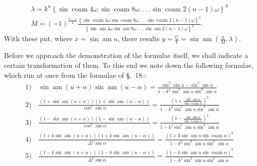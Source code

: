 \documentclass{article}
\begin{document}
\[
\begin{gathered}
\lambda=k^{n}\left\{\sin\operatorname{coam}4\omega.\sin\operatorname{coam}8\omega.\,.\,.\,.\sin\operatorname{coam}2(n-1)\omega\right\}^{4}\\[1.5ex]
M=(-1)^{\frac{n-1}{2}}\frac{\left\{\sin\operatorname{coam}4\omega\sin\operatorname{coam}8\omega.\,.\,.\,.\sin\operatorname{coam}2(n-1)\omega\right\}^{2}}{\left\{\sin\operatorname{am}4\omega\sin\operatorname{am}8\omega.\,.\,.\,.\sin\operatorname{am}2(n-1)\omega\right\}^{2}}.
\end{gathered}
\]
With these put, where $x=\sin\operatorname{am}u$, there results $y=\frac{U}{V}=\sin\operatorname{am}\left(\frac{u}{M},\lambda\right)$.

Before we approach the demonstration of the formulae itself, we shall indicate a certain transformation of them. To this end we note down the following formulae, which run at once from the formulae of §.\ 18.:
\[
\begin{gathered}
\text{1)}\quad\sin\operatorname{am}(u+\alpha)\sin\operatorname{am}(u-\alpha)=\frac{\sin^{2}\operatorname{am}u-\sin^{2}\operatorname{am}\alpha}{1-k^{2}\sin^{2}\operatorname{am}u\sin^{2}\operatorname{am}\alpha}\\[1.5ex]
\text{2)}\quad\frac{\left(1+\sin\operatorname{am}(u+\alpha)\right)\left(1+\sin\operatorname{am}(u-\alpha)\right)}{\cos^{2}\operatorname{am}\alpha}=\frac{\left(1+\frac{\sin\operatorname{am}u}{\sin\operatorname{coam}\alpha}\right)^{2}}{1-k^{2}\sin^{2}\operatorname{am}u\sin^{2}\operatorname{am}\alpha}\\[1.5ex]
\text{3)}\quad\frac{\left(1-\sin\operatorname{am}(u+\alpha)\right)\left(1-\sin\operatorname{am}(u-\alpha)\right)}{\cos^{2}\operatorname{am}\alpha}=\frac{\left(1-\frac{\sin\operatorname{am}u}{\sin\operatorname{coam}\alpha}\right)^{2}}{1-k^{2}\sin^{2}\operatorname{am}u\sin^{2}\operatorname{am}\alpha}\\[1.5ex]
\text{4)}\quad\frac{\left(1+k\sin\operatorname{am}(u+\alpha)\right)\left(1+k\sin\operatorname{am}(u-\alpha)\right)}{\Delta^{2}\operatorname{am}\alpha}=\frac{\left(1+k\sin\operatorname{am}u\sin\operatorname{coam}\alpha\right)^{2}}{1-k^{2}\sin^{2}\operatorname{am}u\sin^{2}\operatorname{am}\alpha}\\[1.5ex]
\text{5)}\quad\frac{\left(1-k\sin\operatorname{am}(u+\alpha)\right)\left(1-k\sin\operatorname{am}(u-\alpha)\right)}{\Delta^{2}\operatorname{am}\alpha}=\frac{\left(1-k\sin\operatorname{am}u\sin\operatorname{coam}\alpha\right)^{2}}{1-k^{2}\sin^{2}\operatorname{am}u\sin^{2}\operatorname{am}\alpha}
\end{gathered}
\]
\end{document}
